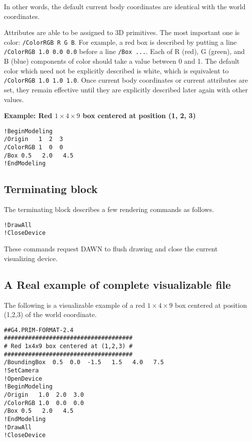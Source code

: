 \noindent 
In other words, the default current body coordinates are identical 
with the world coordinates.

Attributes are able to be assigned to 3D primitives.  
The most important one is color: \verb+/ColorRGB R G B+.
For example, a red box is described by putting a line
\verb+/ColorRGB 1.0 0.0 0.0+ before a line \verb+/Box ...+.  
Each of R (red), G (green), and B (blue) components of color  
should take a value between 0 and 1.  
The default color which need not be explicitly  
described is white, which is equivalent to \verb+/ColorRGB 1.0 1.0 1.0+.  
Once current body coordinates or current attributes are set,  
they remain effective until   
they are explicitly described later again with other values.
\vspace{.20in}

\noindent  
{\bf{}Example: Red $1\times{}4\times{}9$ box centered at position (1, 2, 3)}

\begin{verbatim}
!BeginModeling
/Origin   1  2  3  
/ColorRGB 1  0  0  
/Box 0.5   2.0   4.5  
!EndModeling
\end{verbatim}


\subsection{Terminating block}
The terminating block describes a few rendering commands as follows.

\begin{verbatim}
!DrawAll
!CloseDevice
\end{verbatim}

\noindent
These commands request DAWN to flush drawing and close the current  
visualizing device.

\subsection{A Real example of complete visualizable file}

The following is a visualizable example of a   
red $1\times{}4\times{}9$ box centered at position   
(1,2,3) of the world coordinate.

\begin{verbatim}
##G4.PRIM-FORMAT-2.4
#####################################
# Red 1x4x9 box centered at (1,2,3) #
#####################################
/BoundingBox  0.5  0.0  -1.5   1.5   4.0   7.5
!SetCamera
!OpenDevice
!BeginModeling
/Origin   1.0  2.0  3.0
/ColorRGB 1.0  0.0  0.0  
/Box 0.5   2.0   4.5  
!EndModeling
!DrawAll
!CloseDevice  
\end{verbatim}


